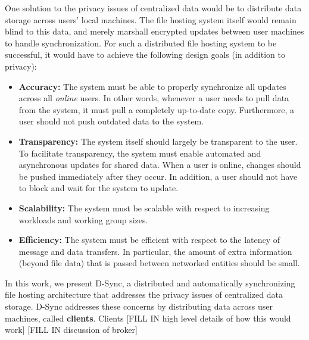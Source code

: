 One solution to the privacy issues of centralized data would be to distribute
data storage across users' local machines.
The file hosting system itself would remain blind to this data, 
and merely marshall encrypted updates between user machines to handle synchronization.
For such a distributed file hosting system to be successful, it would have to achieve
the following design goals (in addition to privacy):
\begin{itemize}
    \item \textbf{Accuracy:} The system must be able to properly synchronize all updates across all \emph{online} users. In other words, whenever a user needs to pull
    data from the system, it must pull a completely up-to-date copy.  Furthermore, a user should not push outdated data to the system.
    \item \textbf{Transparency:} The system itself should largely be transparent to the user. 
    To facilitate transparency, the system must enable automated and asynchronous updates for shared data. When a user is online,
    changes should be pushed immediately after they occur. In addition, a user should not have to block and wait for the system to update.
    \item \textbf{Scalability:} The system must be scalable with respect to increasing workloads and working group sizes.
    \item \textbf{Efficiency:} The system must be efficient with respect to the latency of message and data transfers.
    In particular, the amount of extra information (beyond file data) 
    that is passed between networked entities should be small.
\end{itemize}

In this work, we present D-Sync, a distributed and automatically synchronizing file hosting
architecture that addresses the privacy issues of centralized data storage.
D-Sync addresses these concerns
by distributing data across user machines, called \textbf{clients}.
Clients 
[FILL IN high level details of how this would work]
[FILL IN discussion of broker]

